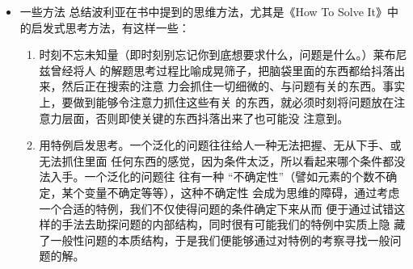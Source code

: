 \documentclass[11pt]{article}
\begin{document}
\begin{itemize}
\item 一些方法
\label{sec:orgheadline200}
总结波利亚在书中提到的思维方法，尤其是《How To Solve It》中的启发式思考方法，有这样一些：

\begin{enumerate}
\item 时刻不忘未知量（即时刻别忘记你到底想要求什么，问题是什么。）莱布尼兹曾经将人
的解题思考过程比喻成晃筛子，把脑袋里面的东西都给抖落出来，然后正在搜索的注意
力会抓住一切细微的、与问题有关的东西。事实上，要做到能够令注意力抓住这些有关
的东西，就必须时刻将问题放在注意力层面，否则即使关键的东西抖落出来了也可能没
注意到。

\item 用特例启发思考。一个泛化的问题往往给人一种无法把握、无从下手、或无法抓住里面
任何东西的感觉，因为条件太泛，所以看起来哪个条件都没法入手。一个泛化的问题往
往有一种 “不确定性”（譬如元素的个数不确定，某个变量不确定等等），这种不确定性
会成为思维的障碍，通过考虑一个合适的特例，我们不仅使得问题的条件确定下来从而
便于通过试错这样的手法去助探问题的内部结构，同时很有可能我们的特例中实质上隐
藏了一般性问题的本质结构，于是我们便能够通过对特例的考察寻找一般问题的解。
\end{enumerate}



\end{itemize}
\end{document}
